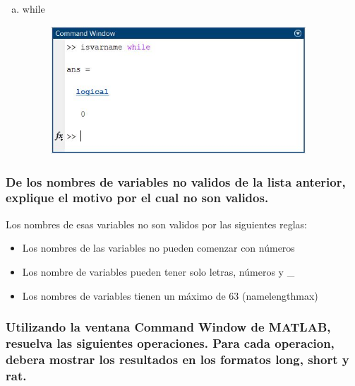 \documentclass{article}
\begin{document}
\begin{enumerate}[a)]
\begin{figure}[H]
        \end{figure}
    \item while
        \begin{figure}[H]
        \centering
        \includegraphics[height=4.8cm]{img6w.jpg}
        \end{figure}
\end{enumerate}

\subsubsection{De los nombres de variables no validos de la lista anterior, explique el motivo por el cual no son validos.}

Los nombres de esas variables no son validos por las siguientes reglas:

\begin{itemize}
    \item Los nombres de las variables no pueden comenzar con números
    \item Los nombre de variables pueden tener solo letras, números y \_
    \item Los nombres de variables tienen un máximo de 63 (namelengthmax)
\end{itemize}
\newpage
\subsubsection{Utilizando la ventana Command Window de MATLAB, resuelva las siguientes operaciones. Para cada operacion, debera mostrar los resultados en los formatos long, short y rat.}
\end{document}
